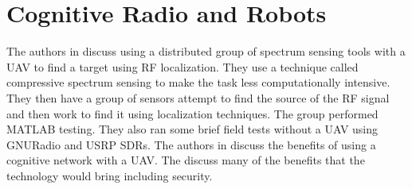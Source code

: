 \section{Cognitive Radio and Robots}

The authors in \cite{6127507} discuss using a distributed group of spectrum sensing tools with a UAV to find a target using RF localization. They use a technique called compressive spectrum sensing to
make the task less computationally intensive. They then have a group of sensors attempt to find the source of the RF signal and then work to find it using localization techniques. The group performed
MATLAB testing. They also ran some brief field tests without a UAV using GNURadio and USRP SDRs. The authors in \cite{7119159} discuss the benefits of using a cognitive network with a UAV. The discuss 
many of the benefits that the technology would bring including security.  
